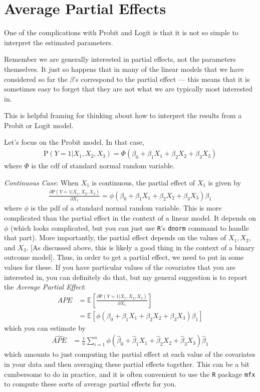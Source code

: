 \documentclass[
  letterpaper,
  DIV=11,
  numbers=noendperiod]{scrreprt}
\begin{document}
\section{Average Partial Effects}\label{average-partial-effects}

One of the complications with Probit and Logit is that it is not so
simple to interpret the estimated parameters.

Remember we are generally interested in partial effects, not the
parameters themselves. It just so happens that in many of the linear
models that we have considered so far the \(\beta\)'s correspond to the
partial effect --- this means that it is sometimes easy to forget that
they are not what we are typically most interested in.

This is helpful framing for thinking about how to interpret the results
from a Probit or Logit model.

Let's focus on the Probit model. In that case, \begin{align*}
  \mathrm{P}(Y=1|X_1,X_2,X_3) = \Phi(\beta_0 + \beta_1 X_1 + \beta_2 X_2 + \beta_3 X_3)
\end{align*} where \(\Phi\) is the cdf of standard normal random
variable.

\emph{Continuous Case}: When \(X_1\) is continuous, the partial effect
of \(X_1\) is given by \begin{align*}
  \frac{\partial \mathrm{P}(Y=1|X_1,X_2,X_3)}{\partial X_1} = \phi(\beta_0 + \beta_1 X_1 + \beta_2 X_2 + \beta_3 X_3) \beta_1
\end{align*} where \(\phi\) is the pdf of a standard normal random
variable. This is more complicated than the partial effect in the
context of a linear model. It depends on \(\phi\) (which looks
complicated, but you can just use \texttt{R}'s \texttt{dnorm} command to
handle that part). More importantly, the partial effect depends on the
values of \(X_1,X_2,\) and \(X_3\). {[}As discussed above, this is
likely a good thing in the context of a binary outcome model{]}. Thus,
in order to get a partial effect, we need to put in some values for
these. If you have particular values of the covariates that you are
interested in, you can definitely do that, but my general suggestion is
to report the \emph{Average Partial Effect}: \begin{align*}
  APE &= \mathbb{E}\left[ \frac{\partial \mathrm{P}(Y=1|X_1,X_2,X_3)}{\partial X_1} \right] \\
  &= \mathbb{E}\left[ \phi(\beta_0 + \beta_1 X_1 + \beta_2 X_2 + \beta_3 X_3) \beta_1 \right]
\end{align*} which you can estimate by \begin{align*}
  \widehat{APE} &= \frac{1}{n} \sum_{i=1}^n \phi(\hat{\beta}_0 + \hat{\beta}_1 X_1 + \hat{\beta}_2 X_2 + \hat{\beta}_3 X_3) \hat{\beta}_1
\end{align*} which amounts to just computing the partial effect at each
value of the covariates in your data and then averaging these partial
effects together. This can be a bit cumbersome to do in practice, and it
is often convenient to use the \texttt{R} package \texttt{mfx} to
compute these sorts of average partial effects for you.
\end{document}
